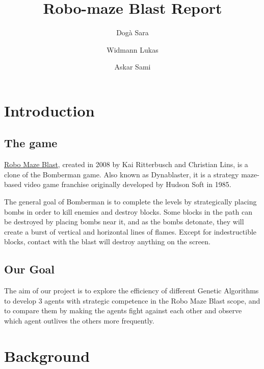 \documentclass[sigconf]{acmart} %
\title{Robo-maze Blast Report}
\author{Dogà Sara}
\author{Widmann Lukas}
\author{Askar Sami}
\begin{document}
\maketitle



\section{Introduction}

\subsection{The game}
\href{https://codeberg.org/chrlns/robo-maze-blast.git}{Robo Maze Blast}, created in 2008 by Kai Ritterbusch and Christian Lins, is a clone of the Bomberman game. Also known as Dynablaster, it is a strategy maze-based video game franchise originally developed by Hudson Soft in 1985.

The general goal of Bomberman is to complete the levels by strategically placing bombs in order to kill enemies and destroy blocks. Some blocks in the path can be destroyed by placing bombs near it, and as the bombs detonate, they will create a burst of vertical and horizontal lines of flames. Except for indestructible blocks, contact with the blast will destroy anything on the screen.

\subsection{Our Goal}
The aim of our project is to explore the efficiency of different Genetic Algorithms to develop 3 agents with strategic competence in the Robo Maze Blast scope, and to compare them by making the agents fight against each other and observe which agent outlives the others more frequently.

\section{Background}
\end{document}
